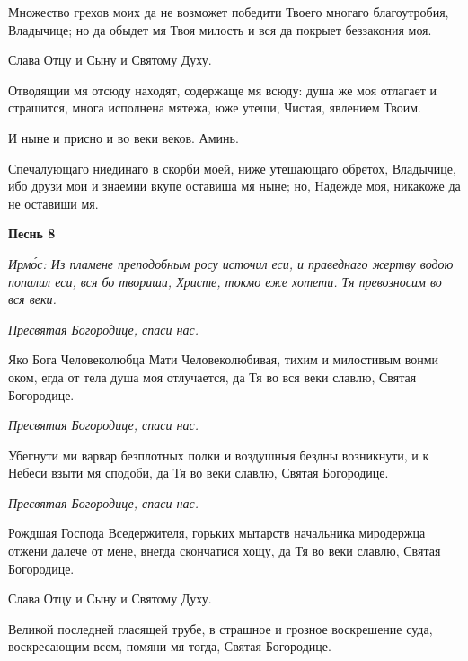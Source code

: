    Множество грехов моих да не возможет победити Твоего многаго
благоутробия, Владычице; но да обыдет мя Твоя милость и вся да покрыет
беззакония моя.



   Слава Отцу и Сыну и Святому Духу.



   Отводящии мя отсюду находят, содержаще мя всюду: душа же моя
отлагает и страшится, многа исполнена мятежа, юже утеши, Чистая,
явлением Твоим.



   И ныне и присно и во веки веков. Аминь.



   Спечалующаго ниединаго в скорби моей, ниже утешающаго обретох,
Владычице, ибо друзи мои и знаемии вкупе оставиша мя ныне; но, Надежде
моя, никакоже да не оставиши мя.




 

\bfseries Песнь 8\normalfont{}


 \itshape Ирмо́с:\normalfont{} Из пламене преподобным росу источил еси, и праведнаго жертву водою
попалил еси, вся бо твориши, Христе, токмо еже хотети. Тя превозносим во вся
веки.



 \itshape  Пресвятая Богородице, спаси нас.
\normalfont{}


   Яко Бога Человеколюбца Мати Человеколюбивая, тихим и милостивым
вонми оком, егда от тела душа моя отлучается, да Тя во вся веки славлю,
Святая Богородице.



 \itshape  Пресвятая Богородице, спаси нас.
\normalfont{}


   Убегнути ми варвар безплотных полки и воздушныя бездны возникнути,
и к Небеси взыти мя сподоби, да Тя во веки славлю, Святая Богородице.



 \itshape  Пресвятая Богородице, спаси нас.
\normalfont{}


   Рождшая Господа Вседержителя, горьких мытарств начальника
миродержца отжени далече от мене, внегда скончатися хощу, да Тя во веки
славлю, Святая Богородице.



   Слава Отцу и Сыну и Святому Духу.



   Великой последней гласящей трубе, в страшное и грозное воскрешение
суда, воскресающим всем, помяни мя тогда, Святая Богородице.



